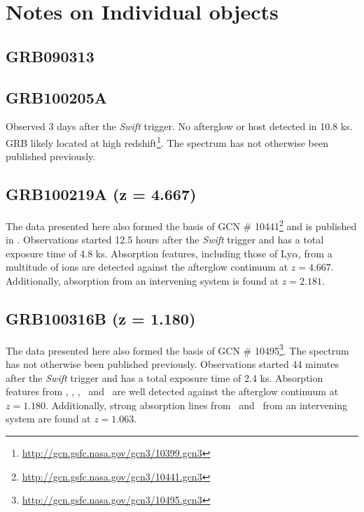 \documentclass[iop, twocolappendix, numberedappendix, tighten, appendixfloats]{emulateapj}
\newcommand{\lya}{Ly$\alpha$}
\newcommand{\feii}{\ion{Fe}{2}}
\newcommand{\mgi}{\ion{Mg}{1}}
\newcommand{\mgii}{\ion{Mg}{2}}
\newcommand{\alii}{\ion{Al}{2}}
\newcommand{\aliii}{\ion{Al}{3}}
\begin{document}
	\def\aj{AJ}
	\def\araa{ARA\&A}
	\def\apj{ApJ}
	\def\apjl{ApJL}
	\def\apjs{ApJS}
	\def\apss{Ap\&SS}
	\def\aap{A\&A}
	\def\aapr{A\&A~Rev.}
	\def\aaps{A\&AS}
	\def\mnras{MNRAS}
	\def\nat{Nature}
	\def\pasp{PASP}
	\def\aplett{Astrophys.~Lett.}
	
	
	
	
	
	\newpage
	\appendix
	\section{Notes on Individual objects}
	
	\subsection{GRB090313}
	
	\subsection{GRB100205A}
	Observed 3 days after the \textit{Swift} trigger. No afterglow or host detected
	in 10.8 ks. GRB likely located at high
	redshift\footnote{\url{http://gcn.gsfc.nasa.gov/gcn3/10399.gcn3}}. The spectrum
	has not otherwise been published previously.
	
	\subsection{GRB100219A (z = 4.667)}
	The data presented here also formed the basis of GCN \#
	10441\footnote{\url{http://gcn.gsfc.nasa.gov/gcn3/10441.gcn3}} and is published
	in \citet{Thone2013}. Observations started 12.5 hours after the \textit{Swift}
	trigger and has a total exposure time of 4.8 ks. Absorption features, including
	those of \lya, from a multitude of ions are detected against the afterglow
	continuum at $z = 4.667$. Additionally, absorption from an intervening system
	is found at $z = 2.181$.
	
	\subsection{GRB100316B (z = 1.180)}
	The data presented here also formed the basis of GCN \#
	10495\footnote{\url{http://gcn.gsfc.nasa.gov/gcn3/10495.gcn3}}. The spectrum
	has not otherwise been published previously. Observations started 44 minutes
	after the \textit{Swift} trigger and has a total exposure time of 2.4 ks.
	Absorption features from \feii, \alii, \aliii,	\mgii~and \mgi~are well detected
	against the afterglow continuum at $z = 1.180$. Additionally, strong absorption
	lines from \feii~and \mgii~from an intervening system are found at $z = 1.063$.
	
\end{document}
